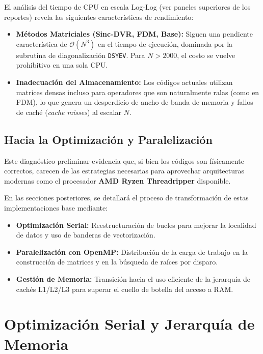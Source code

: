 \documentclass[11pt,fleqn]{article}
\begin{document}
El análisis del tiempo de CPU en escala Log-Log (ver paneles superiores de los reportes) revela las siguientes características de rendimiento:

\begin{itemize}
    \item \textbf{Métodos Matriciales (Sinc-DVR, FDM, Base):} Siguen una pendiente característica de $\mathcal{O}(N^3)$ en el tiempo de ejecución, dominada por la subrutina de diagonalización \texttt{DSYEV}. Para $N > 2000$, el costo se vuelve prohibitivo en una sola CPU.
    \item \textbf{Inadecuación del Almacenamiento:} Los códigos actuales utilizan matrices densas incluso para operadores que son naturalmente ralas (como en FDM), lo que genera un desperdicio de ancho de banda de memoria y fallos de caché (\textit{cache misses}) al escalar $N$.
\end{itemize}

\subsection{Hacia la Optimización y Paralelización}

Este diagnóstico preliminar evidencia que, si bien los códigos son físicamente correctos, carecen de las estrategias necesarias para aprovechar arquitecturas modernas como el procesador \textbf{AMD Ryzen Threadripper} disponible. 

En las secciones posteriores, se detallará el proceso de transformación de estas implementaciones base mediante:
\begin{itemize}
    \item \textbf{Optimización Serial:} Reestructuración de bucles para mejorar la localidad de datos y uso de banderas de vectorización.
    \item \textbf{Paralelización con OpenMP:} Distribución de la carga de trabajo en la construcción de matrices y en la búsqueda de raíces por disparo.
    \item \textbf{Gestión de Memoria:} Transición hacia el uso eficiente de la jerarquía de cachés L1/L2/L3 para superar el cuello de botella del acceso a RAM.
\end{itemize}




\section{Optimización Serial y Jerarquía de Memoria}
\end{document}
